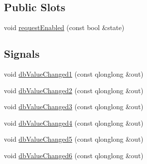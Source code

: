 \subsection*{Public Slots}
\begin{DoxyCompactItemize}
\item 
void \hyperlink{classQEShape_a67d702a4744a60612bb630a2df4df4f4}{requestEnabled} (const bool \&state)
\end{DoxyCompactItemize}
\subsection*{Signals}
\begin{DoxyCompactItemize}
\item 
void \hyperlink{classQEShape_abc67fe7f0af89d4bd92600bb0ac5a978}{dbValueChanged1} (const qlonglong \&out)
\item 
void \hyperlink{classQEShape_a089b5325f80b0dbffbed445bdc3bcc3c}{dbValueChanged2} (const qlonglong \&out)
\item 
void \hyperlink{classQEShape_ab55d481bdcb79ab4b21884d9d44c8f65}{dbValueChanged3} (const qlonglong \&out)
\item 
void \hyperlink{classQEShape_ae6228fa4ba406d12e86d2a954755f1fc}{dbValueChanged4} (const qlonglong \&out)
\item 
void \hyperlink{classQEShape_adc46e991741f8d9f4cbf90855ad4850a}{dbValueChanged5} (const qlonglong \&out)
\item 
void \hyperlink{classQEShape_a2825a53b3e06aa78d6959471e469dde0}{dbValueChanged6} (const qlonglong \&out)
\end{DoxyCompactItemize}
